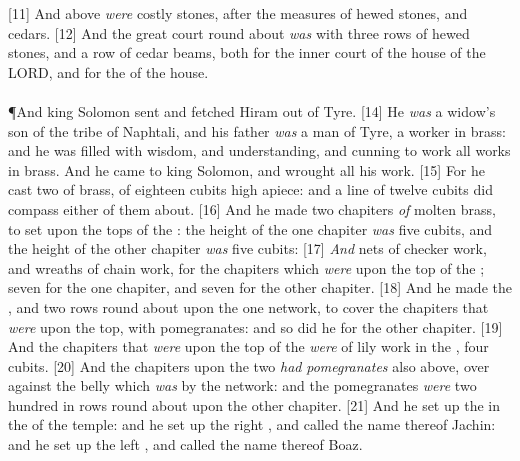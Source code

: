 [11] \textcolor[cmyk]{0.99998,1,0,0}{And above \emph{were} costly stones, after the measures of hewed stones, and cedars.}
[12] \textcolor[cmyk]{0.99998,1,0,0}{And the great court round about \emph{was} with three rows of hewed stones, and a row of cedar beams, both for the inner court of the house of the LORD, and for the  of the house.}\\
\\
\P \textcolor[cmyk]{0.99998,1,0,0}{And king Solomon sent and fetched Hiram out of Tyre.}
[14] \textcolor[cmyk]{0.99998,1,0,0}{He \emph{was} a widow's son of the tribe of Naphtali, and his father \emph{was} a man of Tyre, a worker in brass: and he was filled with wisdom, and understanding, and cunning to work all works in brass. And he came to king Solomon, and wrought all his work.}
[15] \textcolor[cmyk]{0.99998,1,0,0}{For he cast two  of brass, of eighteen cubits high apiece: and a line of twelve cubits did compass either of them about.}
[16] \textcolor[cmyk]{0.99998,1,0,0}{And he made two chapiters \emph{of} molten brass, to set upon the tops of the : the height of the one chapiter \emph{was} five cubits, and the height of the other chapiter \emph{was} five cubits:}
[17] \textcolor[cmyk]{0.99998,1,0,0}{\emph{And} nets of checker work, and wreaths of chain work, for the chapiters which \emph{were} upon the top of the ; seven for the one chapiter, and seven for the other chapiter.}
[18] \textcolor[cmyk]{0.99998,1,0,0}{And he made the , and two rows round about upon the one network, to cover the chapiters that \emph{were} upon the top, with pomegranates: and so did he for the other chapiter.}
[19] \textcolor[cmyk]{0.99998,1,0,0}{And the chapiters that \emph{were} upon the top of the  \emph{were} of lily work in the , four cubits.}
[20] \textcolor[cmyk]{0.99998,1,0,0}{And the chapiters upon the two  \emph{had} \emph{pomegranates} also above, over against the belly which \emph{was} by the network: and the pomegranates \emph{were} two hundred in rows round about upon the other chapiter.}
[21] \textcolor[cmyk]{0.99998,1,0,0}{And he set up the  in the  of the temple: and he set up the right , and called the name thereof Jachin: and he set up the left , and called the name thereof Boaz.}

